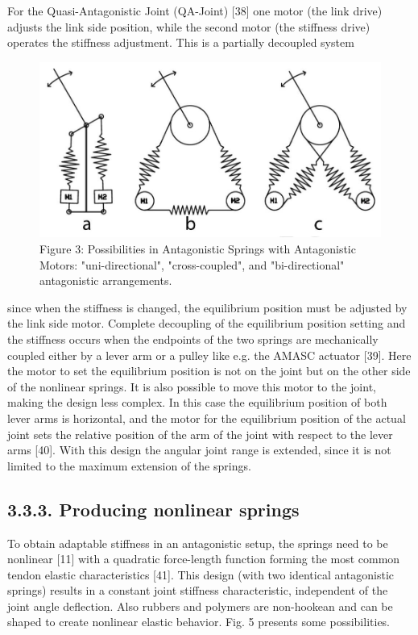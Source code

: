 \documentclass[10pt]{article}
\begin{document}
For the Quasi-Antagonistic Joint (QA-Joint) [38] one motor (the link drive) adjusts the link side position, while the second motor (the stiffness drive) operates the stiffness adjustment. This is a partially decoupled system

\begin{figure}[h]
\begin{center}
  \includegraphics[width=\textwidth]{2025_09_17_f0417c8723605e4ad1efg-10}
\captionsetup{labelformat=empty}
\caption{Figure 3: Possibilities in Antagonistic Springs with Antagonistic Motors: "uni-directional", "cross-coupled", and "bi-directional" antagonistic arrangements.}
\end{center}
\end{figure}

since when the stiffness is changed, the equilibrium position must be adjusted by the link side motor. Complete decoupling of the equilibrium position setting and the stiffness occurs when the endpoints of the two springs are mechanically coupled either by a lever arm or a pulley like e.g. the AMASC actuator [39]. Here the motor to set the equilibrium position is not on the joint but on the other side of the nonlinear springs. It is also possible to move this motor to the joint, making the design less complex. In this case the equilibrium position of both lever arms is horizontal, and the motor for the equilibrium position of the actual joint sets the relative position of the arm of the joint with respect to the lever arms [40]. With this design the angular joint range is extended, since it is not limited to the maximum extension of the springs.

\subsection*{3.3.3. Producing nonlinear springs}
To obtain adaptable stiffness in an antagonistic setup, the springs need to be nonlinear [11] with a quadratic force-length function forming the most common tendon elastic characteristics [41]. This design (with two identical antagonistic springs) results in a constant joint stiffness characteristic, independent of the joint angle deflection. Also rubbers and polymers are non-hookean and can be shaped to create nonlinear elastic behavior. Fig. 5 presents some possibilities.
\end{document}
